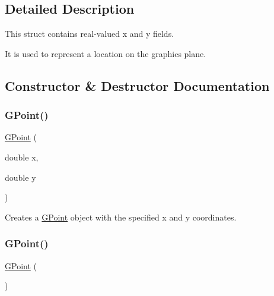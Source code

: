 \subsection{Detailed Description}
This struct contains real-\/valued x and y fields. 

It is used to represent a location on the graphics plane. 

\subsection{Constructor \& Destructor Documentation}
\mbox{\label{structsgl_1_1GPoint_af53a9d37dc824c0280f0cc05ae265f14}} 
\subsubsection{\texorpdfstring{G\+Point()}{GPoint()}\hspace{0.1cm}{\footnotesize\ttfamily [1/2]}}
{\footnotesize\ttfamily \mbox{\hyperlink{structsgl_1_1GPoint}{G\+Point}} (\begin{DoxyParamCaption}\item[{double}]{x,  }\item[{double}]{y }\end{DoxyParamCaption})}



Creates a {\ttfamily \mbox{\hyperlink{structsgl_1_1GPoint}{G\+Point}}} object with the specified {\ttfamily x} and {\ttfamily y} coordinates. 

\mbox{\label{structsgl_1_1GPoint_a70204c3be75958419dddc2c8dc4a4805}} 
\subsubsection{\texorpdfstring{G\+Point()}{GPoint()}\hspace{0.1cm}{\footnotesize\ttfamily [2/2]}}
{\footnotesize\ttfamily \mbox{\hyperlink{structsgl_1_1GPoint}{G\+Point}} (\begin{DoxyParamCaption}{ }\end{DoxyParamCaption})}



